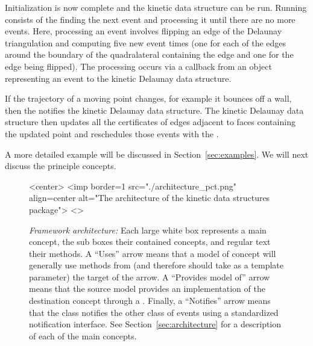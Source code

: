 Initialization is now complete and the kinetic data structure can be
run. Running consists of the  finding the next event
and processing it until there are no more events. Here, processing an
event involves flipping an edge of the Delaunay triangulation and
computing five new event times (one for each of the edges around the
boundary of the quadralateral containing the edge and one for the edge
being flipped). The processing occurs via a callback from an object
representing an event to the kinetic Delaunay data structure.

If the trajectory of a moving point changes, for example it bounces
off a wall, then the  notifies the kinetic Delaunay data
structure. The kinetic Delaunay data structure then updates all the
certificates of edges adjacent to faces containing the updated point and
reschedules those events with the .

A more detailed example will be discussed in
Section~\ref{sec:examples}. We will next discuss the principle
concepts.

\begin{figure}[htb]
\begin{ccHtmlOnly}
<center>
<imp border=1 src="./architecture_pct.png" align=center alt="The architecture of the kinetic data structures package">
<\center>
\end{ccHtmlOnly}
\caption{ \label{fig:architecture} 
{\em Framework architecture:} Each large white box represents a main concept, the sub boxes their
contained concepts, and regular text their methods. A ``Uses'' arrow means
that a model of concept will generally use methods from (and therefore
should take as a template parameter) the target of the arrow.  A
``Provides model of'' arrow means that the source model provides an
implementation of the destination concept through a .
Finally, a ``Notifies'' arrow means that the class notifies the other
class of events using a standardized notification interface.  See
Section~\ref{sec:architecture} for a description of each of the main
concepts. }
\end{figure}

